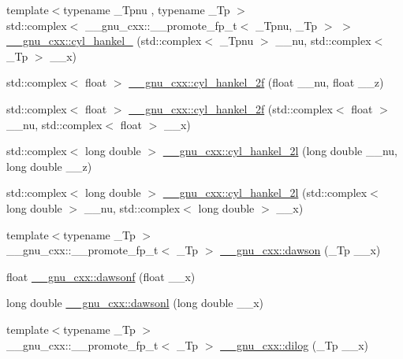 \begin{DoxyCompactItemize}
\item 
{\footnotesize template$<$typename \+\_\+\+Tpnu , typename \+\_\+\+Tp $>$ }\\std\+::complex$<$ \+\_\+\+\_\+gnu\+\_\+cxx\+::\+\_\+\+\_\+promote\+\_\+fp\+\_\+t$<$ \+\_\+\+Tpnu, \+\_\+\+Tp $>$ $>$ \hyperlink{group__gnu__math__spec__func_ga378002c9d6cb4f64683bdb128da1df47}{\+\_\+\+\_\+gnu\+\_\+cxx\+::cyl\+\_\+hankel\+\_} (std\+::complex$<$ \+\_\+\+Tpnu $>$ \+\_\+\+\_\+nu, std\+::complex$<$ \+\_\+\+Tp $>$ \+\_\+\+\_\+x)
\item 
std\+::complex$<$ float $>$ \hyperlink{group__gnu__math__spec__func_ga2b75361870975c47d57bed71b4064ce7}{\+\_\+\+\_\+gnu\+\_\+cxx\+::cyl\+\_\+hankel\+\_\+2f} (float \+\_\+\+\_\+nu, float \+\_\+\+\_\+z)
\item 
std\+::complex$<$ float $>$ \hyperlink{group__gnu__math__spec__func_gae21f9d09b937eaf9729982da5a382f20}{\+\_\+\+\_\+gnu\+\_\+cxx\+::cyl\+\_\+hankel\+\_\+2f} (std\+::complex$<$ float $>$ \+\_\+\+\_\+nu, std\+::complex$<$ float $>$ \+\_\+\+\_\+x)
\item 
std\+::complex$<$ long double $>$ \hyperlink{group__gnu__math__spec__func_ga4babb91ca6906f237e8bd1f0f1a10509}{\+\_\+\+\_\+gnu\+\_\+cxx\+::cyl\+\_\+hankel\+\_\+2l} (long double \+\_\+\+\_\+nu, long double \+\_\+\+\_\+z)
\item 
std\+::complex$<$ long double $>$ \hyperlink{group__gnu__math__spec__func_ga1ac6434925254bd02e108f5a4e52b34d}{\+\_\+\+\_\+gnu\+\_\+cxx\+::cyl\+\_\+hankel\+\_\+2l} (std\+::complex$<$ long double $>$ \+\_\+\+\_\+nu, std\+::complex$<$ long double $>$ \+\_\+\+\_\+x)
\item 
{\footnotesize template$<$typename \+\_\+\+Tp $>$ }\\\+\_\+\+\_\+gnu\+\_\+cxx\+::\+\_\+\+\_\+promote\+\_\+fp\+\_\+t$<$ \+\_\+\+Tp $>$ \hyperlink{group__gnu__math__spec__func_ga0623ddcbfdce696781e19648fde6f33a}{\+\_\+\+\_\+gnu\+\_\+cxx\+::dawson} (\+\_\+\+Tp \+\_\+\+\_\+x)
\item 
float \hyperlink{group__gnu__math__spec__func_ga0a1b8e6760b8c7869127d41d96209318}{\+\_\+\+\_\+gnu\+\_\+cxx\+::dawsonf} (float \+\_\+\+\_\+x)
\item 
long double \hyperlink{group__gnu__math__spec__func_ga6647a7444ff9c7c1f2a8ed36761bfeb2}{\+\_\+\+\_\+gnu\+\_\+cxx\+::dawsonl} (long double \+\_\+\+\_\+x)
\item 
{\footnotesize template$<$typename \+\_\+\+Tp $>$ }\\\+\_\+\+\_\+gnu\+\_\+cxx\+::\+\_\+\+\_\+promote\+\_\+fp\+\_\+t$<$ \+\_\+\+Tp $>$ \hyperlink{group__gnu__math__spec__func_ga7a95a3cb9a53aca2a1ff9752ce9d5e3c}{\+\_\+\+\_\+gnu\+\_\+cxx\+::dilog} (\+\_\+\+Tp \+\_\+\+\_\+x)

\end{DoxyCompactItemize}
